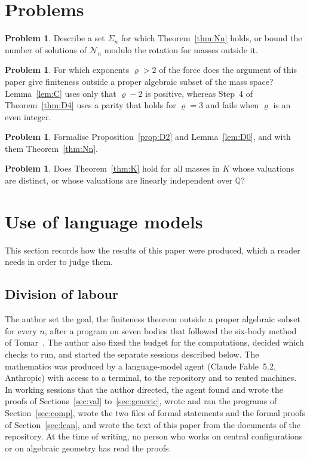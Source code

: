 \documentclass[11pt]{amsart}
\theoremstyle{definition}
\newtheorem{problem}[theorem]{Problem}
\theoremstyle{remark}
\numberwithin{equation}{section}
\newcommand{\QQ}{\mathbb{Q}}
\newcommand{\cN}{\mathcal{N}}
\begin{document}
\section{Problems}\label{sec:problems}

\begin{problem}
Describe a set $\Sigma_n$ for which Theorem~\ref{thm:Nn} holds, or bound the number of solutions of
$\cN_n$ modulo the rotation for masses outside it.
\end{problem}

\begin{problem}
For which exponents $\varrho > 2$ of the force does the argument of this paper give finiteness outside
a proper algebraic subset of the mass space? Lemma~\ref{lem:C} uses only that $\varrho - 2$ is positive,
whereas Step~4 of Theorem~\ref{thm:D4} uses a parity that holds for $\varrho = 3$ and fails when
$\varrho$ is an even integer.
\end{problem}

\begin{problem}
Formalise Proposition~\ref{prop:D2} and Lemma~\ref{lem:D0}, and with them Theorem~\ref{thm:Nn}.
\end{problem}

\begin{problem}
Does Theorem~\ref{thm:K} hold for all masses in $K$ whose valuations are distinct, or whose valuations
are linearly independent over $\QQ$?
\end{problem}

\section{Use of language models}\label{sec:llm}

This section records how the results of this paper were produced, which a reader needs in order to
judge them.

\subsection*{Division of labour} The author set the goal, the finiteness theorem outside a proper
algebraic subset for every $n$, after a program on seven bodies that followed the six-body method of
Tomar~\cite{tomar6}. The author also fixed the budget for the computations, decided which checks to
run, and started the separate sessions described below. The mathematics was produced by a
language-model agent (Claude Fable~5.2, Anthropic) with access to a terminal, to the repository and to
rented machines. In working sessions that the author directed, the agent found and wrote the proofs of
Sections~\ref{sec:val} to~\ref{sec:generic}, wrote and ran the programs of Section~\ref{sec:comp},
wrote the two files of formal statements and the formal proofs of Section~\ref{sec:lean}, and wrote the
text of this paper from the documents of the repository. At the time of writing, no person who works
on central configurations or on algebraic geometry has read the proofs.
\end{document}
